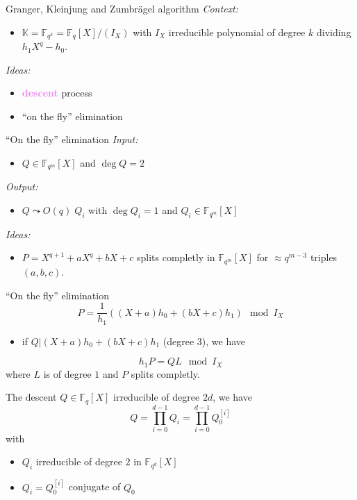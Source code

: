\documentclass[xcolor=x11names,compress]{beamer}
\theoremstyle{break}
\theoremstyle{sc}
\theoremstyle{definition}
\theoremstyle{remark}
\begin{document}
\begin{frame}{Granger, Kleinjung and Zumbrägel algorithm}
  \emph{Context:}
  \begin{itemize}
    \item $\mathbb{K}=\mathbb{F}_{q^k} = \mathbb{F}_q[X]/(I_X)$ with
  $I_X$ irreducible polynomial of degree $k$ dividing $h_1X^q-h_0$.
  \end{itemize}
  \emph{Ideas:}
  \begin{itemize}
    \item \textcolor{violet}{\textbf{descent}} process
    \item ``on the fly'' elimination
  \end{itemize}
\end{frame}

\begin{frame}{``On the fly'' elimination}
  \emph{Input:}
  \begin{itemize}
    \item $Q\in \mathbb{F}_{q^m}[X]$ and $\deg Q = 2$
  \end{itemize}
  \emph{Output:}
  \begin{itemize}
    \item $Q\leadsto O(q)\; Q_i$ with $\deg Q_i = 1$ and $Q_i\in
      \mathbb{F}_{q^m}[X]$
  \end{itemize}

  \emph{Ideas:}
  \begin{itemize}
    \item $P = X^{q+1}+aX^q+bX+c$ splits completly
  in $\mathbb{F}_{q^m}[X]$ for  $\approx q^{m-3}$ triples $(a, b, c)$.
  \end{itemize}
\end{frame}

\begin{frame}{``On the fly'' elimination}
  \[
    P = \frac{1}{h_1}((X+a)h_0 + (bX+c)h_1)\mod I_X
  \]
  \begin{itemize}
    \item if $Q| (X+a)h_0 + (bX+c)h_1$ (degree $3$), we have 
  \end{itemize}
  \[
    h_1P=QL \mod I_X
  \]
  where $L$ is of degree $1$ and $P$ splits completly.

\end{frame}

\begin{frame}{The descent}
  $Q\in\mathbb{F}_{q}[X]$ irreducible of degree $2d$, we have
  \[
    Q=\prod_{i=0}^{d-1} Q_i = \prod_{i=0}^{d-1}Q_0^{[i]}
  \]
  with 
  \begin{itemize}
    \item $Q_i$ irreducible of degree $2$ in $\mathbb{F}_{q^d}[X]$ 
    \item $Q_i=Q_0^{[i]}$ conjugate of $Q_0$
  \end{itemize}
\end{frame}
  
\end{document}
